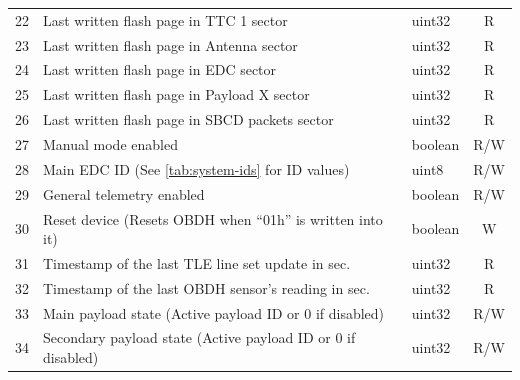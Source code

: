 \begin{longtable}[c]{cL{0.70\textwidth}lc}
    22                   & Last written flash page in TTC 1 sector                                          & uint32                   & R                   \\
    23                   & Last written flash page in Antenna sector                                        & uint32                   & R                   \\
    24                   & Last written flash page in EDC sector                                            & uint32                   & R                   \\
    25                   & Last written flash page in Payload X sector                                      & uint32                   & R                   \\
    26                   & Last written flash page in SBCD packets sector                                   & uint32                   & R                   \\
    27                   & Manual mode enabled                                                              & boolean                  & R/W                 \\
    28                   & Main EDC ID (See \autoref{tab:system-ids} for ID values)                         & uint8                    & R/W                 \\
    29                   & General telemetry enabled                                                        & boolean                  & R/W                 \\
    30                   & Reset device (Resets OBDH when ``01h'' is written into it)                       & boolean                  & W                   \\
    31                   & Timestamp of the last TLE line set update in sec.                                & uint32                   & R                   \\
    32                   & Timestamp of the last OBDH sensor's reading in sec.                              & uint32                   & R                   \\
    33                   & Main payload state (Active payload ID or 0 if disabled)                          & uint32                   & R/W                 \\
    34                   & Secondary payload state (Active payload ID or 0 if disabled)                     & uint32                   & R/W                 \\

\end{longtable}
